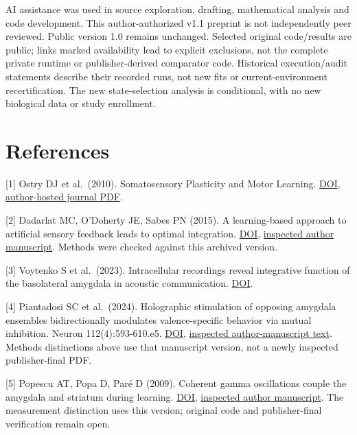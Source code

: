 \documentclass[
  american,
  11pt,
  letterpaper,
]{article}
\begin{document}
\par

\ifdim\dimexpr\pagegoal-\pagetotal\relax<70pt\newpage\fi AI assistance was used in source exploration, drafting, mathematical analysis and code development. This author-authorized v1.1 preprint is not independently peer reviewed. Public version 1.0 remains unchanged. Selected original code/results are public; links marked availability lead to explicit exclusions, not the complete private runtime or publisher-derived comparator code. Historical execution/audit statements describe their recorded runs, not new fits or current-environment recertification. The new state-selection analysis is conditional, with no new biological data or study enrollment.

\begingroup\small

\section{References}\label{references}

{[}1{]} Ostry DJ et al.~(2010). Somatosensory Plasticity and Motor Learning. \href{https://doi.org/10.1523/JNEUROSCI.4571-09.2010}{DOI}, \href{https://gribblelab.org/assets/files/papers/2010_JNeurosci_ODMWG.pdf}{author-hosted journal PDF}.

{[}2{]} Dadarlat MC, O'Doherty JE, Sabes PN (2015). A learning-based approach to artificial sensory feedback leads to optimal integration. \href{https://doi.org/10.1038/nn.3883}{DOI}, \href{https://pmc.ncbi.nlm.nih.gov/articles/PMC4282864/}{inspected author manuscript}. Methods were checked against this archived version.

{[}3{]} Voytenko S et al.~(2023). Intracellular recordings reveal integrative function of the basolateral amygdala in acoustic communication. \href{https://doi.org/10.1152/jn.00103.2023}{DOI}.

{[}4{]} Piantadosi SC et al.~(2024). Holographic stimulation of opposing amygdala ensembles bidirectionally modulates valence-specific behavior via mutual inhibition. Neuron 112(4):593-610.e5. \href{https://doi.org/10.1016/j.neuron.2023.11.007}{DOI}, \href{https://pmc.ncbi.nlm.nih.gov/articles/PMC10984369/}{inspected author-manuscript text}. Methods distinctions above use that manuscript version, not a newly inspected publisher-final PDF.

{[}5{]} Popescu AT, Popa D, Paré D (2009). Coherent gamma oscillations couple the amygdala and striatum during learning. \href{https://doi.org/10.1038/nn.2305}{DOI}, \href{https://pmc.ncbi.nlm.nih.gov/articles/PMC2737601/}{inspected author manuscript}. The measurement distinction uses this version; original code and publisher-final verification remain open.
\end{document}
